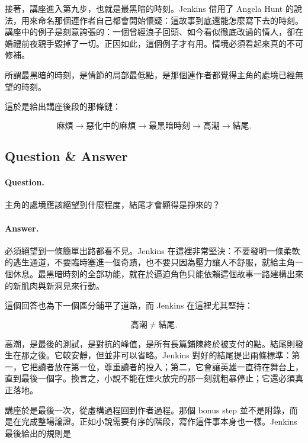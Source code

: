 接著，講座進入第九步，也就是最黑暗的時刻。Jenkins 借用了 Angela Hunt 的說法，用來命名那個連作者自己都會開始懷疑：這故事到底還能怎麼寫下去的時刻。講座中的例子是刻意誇張的：一個曾經浪子回頭、如今看似徹底改過的情人，卻在婚禮前夜親手毀掉了一切。正因如此，這個例子才有用。情境必須看起來真的不可修補。

\begin{definition}
所謂最黑暗的時刻，是情節的局部最低點，是那個連作者都覺得主角的處境已經無望的時刻。
\end{definition}

這於是給出講座後段的那條鏈：

\begin{equation}
\text{麻煩} \to \text{惡化中的麻煩} \to \text{最黑暗時刻} \to \text{高潮} \to \text{結尾}.
\end{equation}

\subsection{Question \& Answer}

\paragraph{Question.} 主角的處境應該絕望到什麼程度，結尾才會顯得是掙來的？

\paragraph{Answer.} 必須絕望到一條簡單出路都看不見。Jenkins 在這裡非常堅決：不要發明一條柔軟的逃生通道，不要臨時塞進一個奇蹟，也不要只因為壓力讓人不舒服，就給主角一個休息。最黑暗時刻的全部功能，就在於逼迫角色只能依賴這個故事一路建構出來的新肌肉與新洞見來行動。

這個回答也為下一個區分鋪平了道路，而 Jenkins 在這裡尤其堅持：

\begin{equation}
\text{高潮} \neq \text{結尾}.
\end{equation}

高潮，是最後的測試，是對抗的峰值，是所有長篇鋪陳終於被支付的點。結尾則發生在那之後。它較安靜，但並非可以省略。Jenkins 對好的結尾提出兩條標準：第一，它把讀者放在第一位，尊重讀者的投入；第二，它會讓英雄一直待在舞台上，直到最後一個字。換言之，小說不能在煙火放完的那一刻就粗暴停止；它還必須真正落地。

講座於是最後一次，從虛構過程回到作者過程。那個 bonus step 並不是附錄，而是在完成整場論證。正如小說需要有序的階段，寫作這件事本身也一樣。Jenkins 最後給出的規則是

